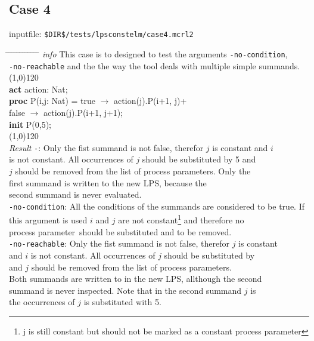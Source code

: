 \index{}\documentclass[a4paper,10pt]{article}
\theoremstyle{plain}
\theoremstyle{definition}
\newcommand{\pp}{process parameter}
\newcommand{\pps}{process parameters}
\newcommand{\ti}{\textit}
\newcommand{\tb}{\textbf}
\newcommand{\tabw}{\hspace*{15.mm} \= \hspace*{20.mm} \= \hspace*{5.mm} \= \hspace*{5.mm} \= \hspace*{5.mm} \= \hspace*{5.mm}  \= \hspace*{5.mm}  \= \hspace*{5.mm}  \= \hspace*{5.mm} \= \hspace*{5.mm} \= \hspace*{5.mm}  \= \hspace*{5.mm}  \= \hspace*{5.mm}\kill}
\begin{document}
\subsection*{Case 4}
inputfile: \verb"$DIR$/tests/lpsconstelm/case4.mcrl2"
\begin{tabbing}
\tabw
\ti{info} \> This case is to designed to test the arguments \verb"-no-condition", \\
\> \verb"-no-reachable" and the the way the tool deals with multiple simple summands. \\
\line(1,0){120}\\
\tb{act}  \> action: Nat;\\
\tb{proc} \> P(i,j: Nat) \> = \> true  $\rightarrow$ action(j).P(i+1, j)+\\
          \>             \>   \> false $\rightarrow$ action(j).P(i+1, j+1);\\
\tb{init} \> P(0,5);\\
\line(1,0){120}\\
\ti{Result}
\> \verb"-": \> \> Only the fist summand is not false, therefor $j$ is constant and $i$ \\
\> \> \> is not constant. All occurrences of $j$ should be substituted by 5 and \\
\> \> \> $j$ should be removed from the list of \pps. Only the \\
\> \> \> first summand is written to the new LPS, because the \\
\> \> \> second summand is never evaluated.\\
\> \verb"-no-condition": \> \> All the conditions of the summands are considered to be true. If \\
\> \> \> this argument is used $i$ and $j$ are not constant\footnote{j is still constant but should not be marked as a constant \pp } and therefore no \\
\> \> \> \pp\ should be substituted and to be removed.\\
\> \verb"-no-reachable": \> \> Only the fist summand is not false, therefor $j$ is constant \\
\> \> \> and $i$ is not constant. All occurrences of $j$ should be substituted by \\
\> \>  and $j$ should be removed from the list of \pps. \\
\> \> \> Both summands are written to in the new LPS, allthough the second \\
\> \> \> summand is never inspected. Note that in the second summand $j$ is \\
\> \> \> the occurrences of $j$ is substituted with 5.\\
\end{tabbing}
\end{document}

